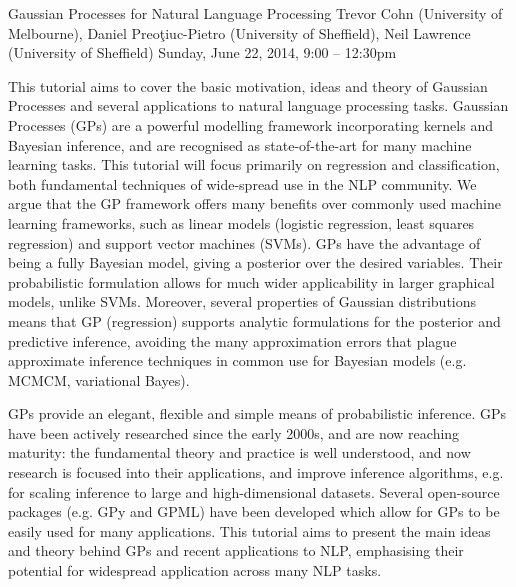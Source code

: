 \begin{tutorial}{Gaussian Processes for Natural Language Processing}
  {Trevor Cohn (University of Melbourne), Daniel Preoţiuc-Pietro (University of Sheffield), Neil Lawrence (University of Sheffield)}
  {Sunday, June 22, 2014, 9:00 -- 12:30pm}
  {\TutLocA}

This tutorial aims to cover the basic motivation, ideas and theory of Gaussian Processes and several applications to natural language processing tasks. Gaussian Processes (GPs) are a powerful modelling framework incorporating kernels and Bayesian inference, and are recognised as state-of-the-art for many machine learning tasks. This tutorial will focus primarily on regression and classification, both fundamental techniques of wide-spread use in the NLP community. We argue that the GP framework offers many benefits over commonly used machine learning frameworks, such as linear models (logistic regression, least squares regression) and support vector machines (SVMs). GPs have the advantage of being a fully Bayesian model, giving a posterior over the desired variables. Their probabilistic formulation allows for much wider applicability in larger graphical models, unlike SVMs. Moreover, several properties of Gaussian distributions means that GP (regression) supports analytic formulations for the posterior and predictive inference, avoiding the many approximation errors that plague approximate inference techniques in common use for Bayesian models (e.g. MCMCM, variational Bayes).

GPs provide an elegant, flexible and simple means of probabilistic inference. GPs have been actively researched since the early 2000s, and are now reaching maturity: the fundamental theory and practice is well understood, and now research is focused into their applications, and improve inference algorithms, e.g. for scaling inference to large and high-dimensional datasets. Several open-source packages (e.g. GPy and GPML) have been developed which allow for GPs to be easily used for many applications. This tutorial aims to present the main ideas and theory behind GPs and recent applications to NLP, emphasising their potential for widespread application across many NLP tasks.
\end{tutorial}
